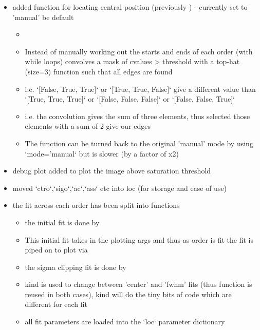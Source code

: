 \begin{itemize}
\item added function for locating central position (previously ) - currently set to 'manual' be default
    \begin{itemize}
    \item {} 
    \item  Instead of manually working out the starts and ends of each order (with while loops) convolves a mask of cvalues > threshold with a top-hat (size=3) function such that all edges are found
    \item i.e. `[False, True, True]` or `[True, True, False]` give a different value than `[True, True, True]` or `[False, False, False]` or `[False, False, True]`
    \item i.e. the convolution gives the sum of three elements, thus selected those elements with a sum of 2 give our edges
    \item The function can be turned back to the original 'manual' mode by using `mode='manual` but is slower (by a factor of x2)
	\end{itemize}

\item debug plot added to plot the image above saturation threshold 
        
\item moved `ctro`,`sigo`,`ac`,`ass` etc into loc (for storage and ease of use)        
        
\item the fit across each order has been split into functions
    \begin{itemize}
	\item the initial fit is done by 
	\item This initial fit takes in the plotting args and thus as order is fit the fit is piped on to plot via 
	\item the sigma clipping fit is done by 
	\item kind is used to change between 'center' and 'fwhm' fits (thus function is reused in both cases), kind will do the tiny bits of code which are different for each fit
	\item all fit parameters are loaded into the `loc` parameter dictionary
	\end{itemize}


\end{itemize}
